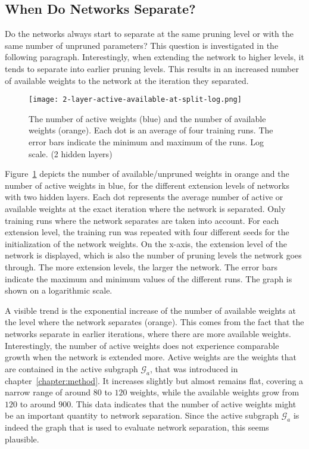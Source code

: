 \subsection{When Do Networks Separate?}
Do the networks always start to separate at the same pruning level or with the same number of unpruned parameters?
This question is investigated in the following paragraph.
Interestingly, when extending the network to higher levels, it tends to separate into earlier pruning levels.
This results in an increased number of available weights to the network at the iteration they separated.
\begin{figure}[t] %
    \centering
    \texttt{[image: 2-layer-active-available-at-split-log.png]}
    \caption[Comparing active and available weights (2 hidden layers)]{
    The number of active weights (blue) and the number of available weights (orange).
    Each dot is an average of four training runs.
    The error bars indicate the minimum and maximum of the runs.
    Log scale. (2 hidden layers)
    }\label{fig:2l-active-split}
\end{figure}
Figure~\ref{fig:2l-active-split} depicts the number of available/unpruned weights in orange and the number of active weights in blue, for the different extension levels of networks with two hidden layers.
Each dot represents the average number of active or available weights at the exact iteration where the network is separated.
Only training runs where the network separates are taken into account.
For each extension level, the training run was repeated with four different seeds for the initialization of the network weights.
On the x-axis, the extension level of the network is displayed, which is also the number of pruning levels the network goes through.
The more extension levels, the larger the network.
The error bars indicate the maximum and minimum values of the different runs.
The graph is shown on a logarithmic scale.

A visible trend is the exponential increase of the number of available weights at the level where the network separates (orange).
This comes from the fact that the networks separate in earlier iterations, where there are more available weights.
Interestingly, the number of active weights does not experience comparable growth when the network is extended more.
Active weights are the weights that are contained in the active subgraph $\mathcal{G}_a$, that was introduced in chapter~\ref{chapter:method}.
It increases slightly but almost remains flat, covering a narrow range of around $80$ to $120$ weights, while the available weights grow from $120$ to around $900$.
This data indicates that the number of active weights might be an important quantity to network separation.
Since the active subgraph $\mathcal{G}_a$ is indeed the graph that is used to evaluate network separation, this seems plausible.
 
